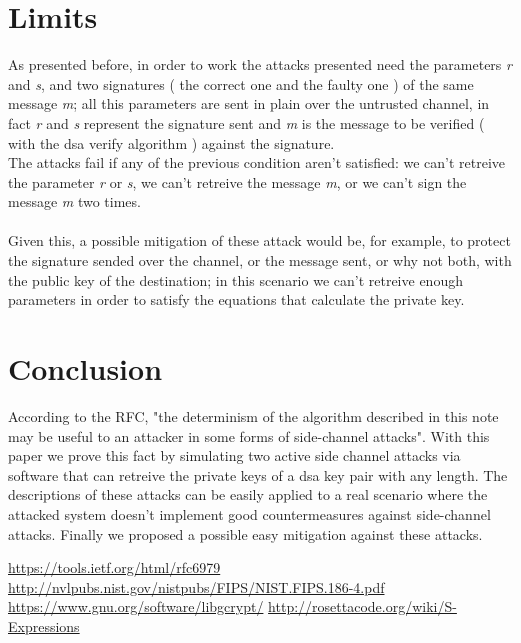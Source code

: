 \documentclass[11pt,english]{article}
\begin{document}
\section{Limits}
As presented before, in order to work the attacks presented need the parameters \textit{r} and \textit{s}, and two signatures ( the correct one and the faulty one ) of the same message \textit{m}; all this parameters are sent in plain over the untrusted channel, in fact \textit{r} and \textit{s} represent the signature sent and \textit{m} is the message to be verified ( with the dsa verify algorithm ) against the signature.\\
The attacks fail if any of the previous condition aren't satisfied: we can't retreive the parameter \textit{r} or \textit{s}, we can't retreive the message \textit{m}, or we can't sign the message \textit{m} two times.\\\\
Given this, a possible mitigation of these attack would be, for example, to protect the signature sended over the channel, or the  message sent, or why not both, with the public key of the destination; in this scenario we can't retreive enough parameters in order to satisfy the equations that calculate the private key.


\section{Conclusion}
According to the RFC\cite{rfc}, "the determinism of the algorithm described in this note may be useful to an attacker in some forms of side-channel attacks". With this paper we prove this fact by simulating two active side channel attacks via software that can retreive the private keys of a dsa key pair with any length. The descriptions of these attacks can be easily applied to a real scenario where the attacked system doesn't implement good countermeasures against side-channel attacks. Finally we proposed a possible easy mitigation against these attacks. 

\begin{thebibliography}{10}
 \url{https://tools.ietf.org/html/rfc6979}
 \url{http://nvlpubs.nist.gov/nistpubs/FIPS/NIST.FIPS.186-4.pdf}
 \url{https://www.gnu.org/software/libgcrypt/}
 \url{http://rosettacode.org/wiki/S-Expressions}
\end{thebibliography}
\end{document}

